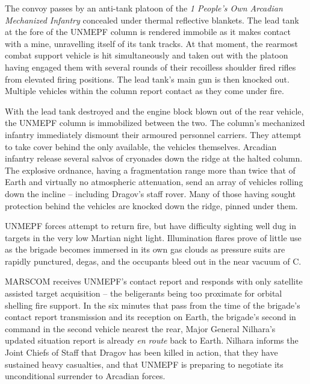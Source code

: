 The convoy passes by an anti-tank platoon of the {\it 1 People's Own Arcadian Mechanized Infantry} concealed under thermal reflective blankets. The lead tank at the fore of the UNMEPF column is rendered immobile as it makes contact with a mine, unravelling itself of its tank tracks. At that moment, the rearmost combat support vehicle is hit simultaneously and taken out with the platoon having engaged them with several rounds of their recoilless shoulder fired rifles from elevated firing positions. The lead tank's main gun is then knocked out. Multiple vehicles within the column report contact as they come under fire.

With the lead tank destroyed and the engine block blown out of the rear vehicle, the UNMEPF column is immobilized between the two. The column's mechanized infantry immediately dismount their armoured personnel carriers. They attempt to take cover behind the only available, the vehicles themselves. Arcadian infantry release several salvos of cryonades down the ridge at the halted column. The explosive ordnance, having a fragmentation range more than twice that of Earth and virtually no atmospheric attenuation, send an array of vehicles rolling down the incline -- including Dragov's staff rover. Many of those having sought protection behind the vehicles are knocked down the ridge, pinned under them.

UNMEPF forces attempt to return fire, but have difficulty sighting well dug in targets in the very low Martian night light. Illumination flares prove of little use as the brigade becomes immersed in its own gas clouds as pressure suits are rapidly punctured, degas, and the occupants bleed out in the near vacuum of C.

MARSCOM receives UNMEPF's contact report and responds with only satellite assisted target acquisition -- the beligerants being too proximate for orbital shelling fire support. In the six minutes that pass from the time of the brigade's contact report transmission and its reception on Earth, the brigade's second in command in the second vehicle nearest the rear, Major General Nilhara's updated situation report is already {\it en route} back to Earth. Nilhara informs the Joint Chiefs of Staff that Dragov has been killed in action, that they have sustained heavy casualties, and that UNMEPF is preparing to negotiate its unconditional surrender to Arcadian forces.
\StopTimelineDate

